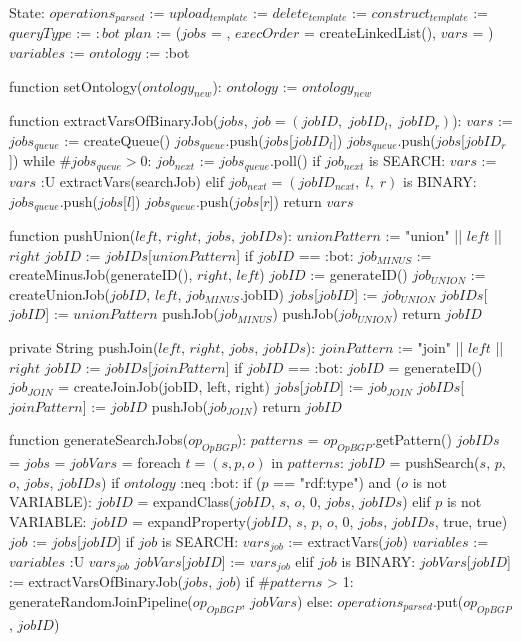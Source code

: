 State:
    $operations_{parsed}$ := {}
    $upload_{template}$ := {}
    $delete_{template}$ := {}
    $construct_{template}$ := {}
    $queryType$ := $:bot$
    $plan$ := ($jobs$ = {}, $execOrder$ = createLinkedList(), $vars$ = {})
    $variables$ := {}
    $ontology$ := :bot

function setOntology($ontology_{new}$):
    $ontology$ := $ontology_{new}$

function extractVarsOfBinaryJob($jobs$, $job = (jobID, \; jobID_l, \; jobID_r)$): 
    $vars$ := {}
    $jobs_{queue}$ := createQueue()
    $jobs_{queue}$.push($jobs$[$jobID_l$])
    $jobs_{queue}$.push($jobs$[$jobID_r$])
    while $\#jobs_{queue} > 0$: 
        $job_{next}$ := $jobs_{queue}$.poll()
        if $job_{next}$ is SEARCH:
            $vars$ := $vars$ :U extractVars(searchJob)
        elif $job_{next} = (jobID_{next}, \; l, \; r)$ is BINARY:
            $jobs_{queue}$.push($jobs$[$l$])
            $jobs_{queue}$.push($jobs$[$r$])
    return $vars$

function pushUnion($left$, $right$, $jobs$, $jobIDs$): 
    $unionPattern$ := "union" || $left$ || $right$
    $jobID$ := $jobIDs$[$unionPattern$]
    if $jobID$ == :bot: 
        $job_{MINUS}$ := createMinusJob(generateID(), $right$, $left$)
        $jobID$ := generateID()
        $job_{UNION}$ := createUnionJob($jobID$, $left$, $job_{MINUS}$.jobID)
        $jobs$[$jobID$] := $job_{UNION}$
        $jobIDs$[$jobID$] := $unionPattern$
        pushJob($job_{MINUS}$)
        pushJob($job_{UNION}$)
    return $jobID$

private String pushJoin($left$, $right$, $jobs$, $jobIDs$):
    $joinPattern$ := "join" || $left$ || $right$
    $jobID$ := $jobIDs$[$joinPattern$]
    if $jobID$ == :bot:
        $jobID$ = generateID()
        $job_{JOIN}$ = createJoinJob(jobID, left, right)
        $jobs$[$jobID$] := $job_{JOIN}$
        $jobIDs$[$joinPattern$] := $jobID$
        pushJob($job_{JOIN}$)
    return $jobID$

function generateSearchJobs($op_{OpBGP}$):
    $patterns$ = $op_{OpBGP}$.getPattern()
    $jobIDs$ = {}
    $jobs$ = {}
    $jobVars$ = {}
    foreach $t = (s, p, o)$ in $patterns$:
        $jobID$ = pushSearch($s$, $p$, $o$, $jobs$, $jobIDs$)
        if $ontology$ :neq :bot:
            if ($p$ == "rdf:type") and ($o$ is not VARIABLE):
                $jobID$ = expandClass($jobID$, $s$, $o$, 0, $jobs$, $jobIDs$)
            elif $p$ is not VARIABLE:
                $jobID$ = expandProperty($jobID$, $s$, $p$, $o$, 0, $jobs$, $jobIDs$, true, true)
        $job$ := $jobs$[$jobID$]
        if $job$ is SEARCH:
            $vars_{job}$ := extractVars($job$)
            $variables$ := $variables$ :U $vars_{job}$
            $jobVars$[$jobID$] := $vars_{job}$
        elif $job$ is BINARY:
            $jobVars$[$jobID$] := extractVarsOfBinaryJob($jobs$, $job$)
    if $\#patterns$ > 1:
        generateRandomJoinPipeline($op_{OpBGP}$, $jobVars$)
    else:
        $operations_{parsed}$.put($op_{OpBGP}$, $jobID$)

